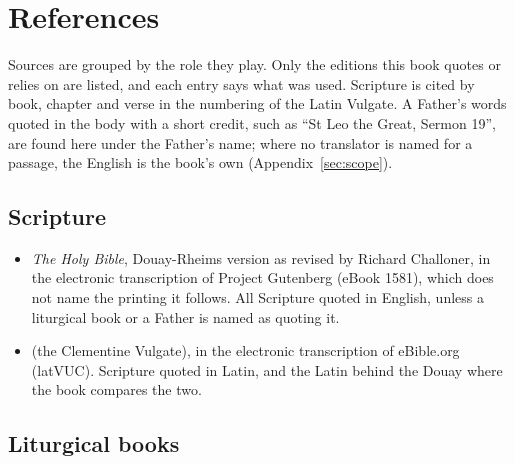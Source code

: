 \section{References}\label{sec:references}

Sources are grouped by the role they play. Only the editions this book quotes or relies on are
listed, and each entry says what was used. Scripture is cited by book, chapter and verse in the
numbering of the Latin Vulgate. A Father's words quoted in the body with a short credit, such as
``St Leo the Great, Sermon 19'', are found here under the Father's name; where no translator is
named for a passage, the English is the book's own (Appendix~\ref{sec:scope}).

\subsection{Scripture}

\begin{itemize}[leftmargin=1.3em, itemsep=0.3em]
\item \textit{The Holy Bible}, Douay-Rheims version as revised by Richard Challoner, in the
electronic transcription of Project Gutenberg (eBook 1581), which does not name the printing it
follows. All Scripture quoted in English, unless a liturgical book or a Father is named as quoting
it.
\item {} (the Clementine Vulgate), in the electronic
transcription of eBible.org (latVUC). Scripture quoted in Latin, and the Latin behind the Douay
where the book compares the two.
\end{itemize}

\subsection{Liturgical books}

